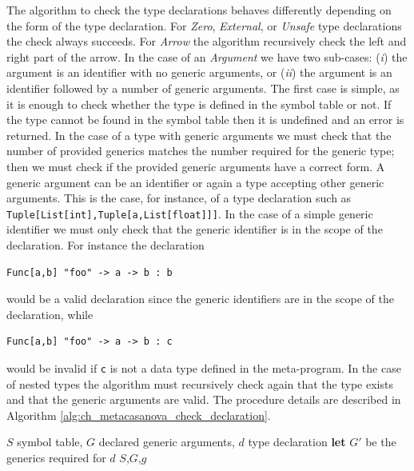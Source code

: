The algorithm to check the type declarations behaves differently depending on the form of the type declaration. For \textit{Zero}, \textit{External}, or \textit{Unsafe} type declarations the check always succeeds. For \textit{Arrow} the algorithm recursively check the left and right part of the arrow. In the case of an \textit{Argument} we have two sub-cases: (\textit{i}) the argument is an identifier with no generic arguments, or (\textit{ii}) the argument is an identifier followed by a number of generic arguments. The first case is simple, as it is enough to check whether the type is defined in the symbol table or not. If the type cannot be found in the symbol table then it is undefined and an error is returned. In the case of a type with generic arguments we must check that the number of provided generics matches the number required for the generic type; then we must check if the provided generic arguments have a correct form. A generic argument can be an identifier or again a type accepting other generic arguments. This is the case, for instance, of a type declaration such as \texttt{Tuple[List[int],Tuple[a,List[float]]]}. In the case of a simple generic identifier we must only check that the generic identifier is in the scope of the declaration. For instance the declaration

\begin{lstlisting}
Func[a,b] "foo" -> a -> b : b
\end{lstlisting}

\noindent
would be a valid declaration since the generic identifiers are in the scope of the declaration, while

\begin{lstlisting}
Func[a,b] "foo" -> a -> b : c
\end{lstlisting}

\noindent
would be invalid if \texttt{c} is not a data type defined in the meta-program. In the case of nested types the algorithm must recursively check again that the type exists and that the generic arguments are valid. The procedure details are described in Algorithm \ref{alg:ch_metacasanova_check_declaration}.

\begin{algorithm}
	\caption{Type checking of a symbol declaration}
	\label{alg:ch_metacasanova_check_declaration}
	\begin{algorithmic}
		 {$S$ symbol table, $G$ declared generic arguments, $d$ type declaration}
				\State \Return
			\Else
				\State \textbf{let} $G'$ be the generics required for $d$
					\Else
							\State {} {$S$,$G$,$g$}
						\EndFor
					\EndIf
				\Else
						\State \Return
					\Else
					\EndIf
				\EndIf
			\EndIf
		\EndFunction
	\end{algorithmic}
\end{algorithm}

